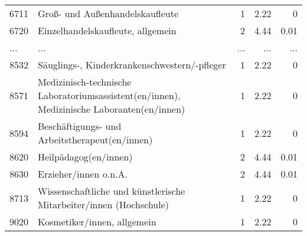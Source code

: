\begin{longtable}{lXrrr}
        6711 & \multicolumn{1}{X}{Groß- und Außenhandelskaufleute} & %
          \num{1} &
          \num[round-mode=places,round-precision=2]{2.22} &
          \num[round-mode=places,round-precision=2]{0} \\
        6720 & \multicolumn{1}{X}{Einzelhandelskaufleute, allgemein} & %
          \num{2} &
          \num[round-mode=places,round-precision=2]{4.44} &
          \num[round-mode=places,round-precision=2]{0.01} \\
       ... & ... & ... & ... & ... \\
        8532 & \multicolumn{1}{X}{Säuglings-, Kinderkrankenschwestern/-pfleger} & %
          \num{1} &
          \num[round-mode=places,round-precision=2]{2.22} &
          \num[round-mode=places,round-precision=2]{0} \\

        8571 & \multicolumn{1}{X}{Medizinisch-technische Laboratoriumsassistent(en/innen), Medizinische Laboranten(en/innen)} & %
          \num{1} &
          \num[round-mode=places,round-precision=2]{2.22} &
          \num[round-mode=places,round-precision=2]{0} \\

        8594 & \multicolumn{1}{X}{Beschäftigungs- und Arbeitstherapeut(en/innen)} & %
          \num{1} &
          \num[round-mode=places,round-precision=2]{2.22} &
          \num[round-mode=places,round-precision=2]{0} \\

        8620 & \multicolumn{1}{X}{Heilpädagog(en/innen)} & %
          \num{2} &
          \num[round-mode=places,round-precision=2]{4.44} &
          \num[round-mode=places,round-precision=2]{0.01} \\

        8630 & \multicolumn{1}{X}{Erzieher/innen o.n.A.} & %
          \num{2} &
          \num[round-mode=places,round-precision=2]{4.44} &
          \num[round-mode=places,round-precision=2]{0.01} \\

        8713 & \multicolumn{1}{X}{Wissenschaftliche und künstlerische Mitarbeiter/innen (Hochschule)} & %
          \num{1} &
          \num[round-mode=places,round-precision=2]{2.22} &
          \num[round-mode=places,round-precision=2]{0} \\

        9020 & \multicolumn{1}{X}{Kosmetiker/innen, allgemein} & %
          \num{1} &
          \num[round-mode=places,round-precision=2]{2.22} &
          \num[round-mode=places,round-precision=2]{0} \\


\end{longtable}
